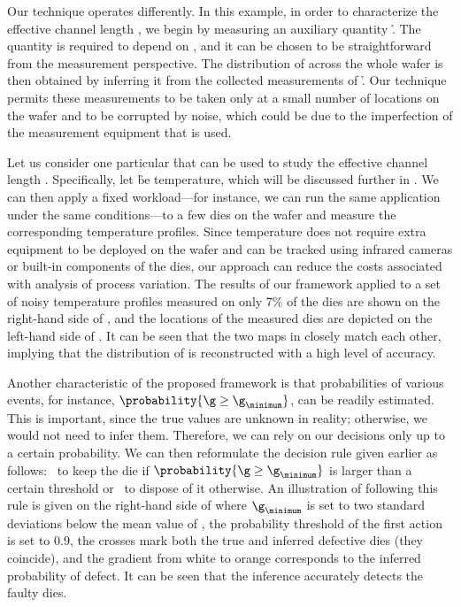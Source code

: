 Our technique operates differently. In this example, in order to characterize
the effective channel length \g, we begin by measuring an auxiliary quantity \h.
The quantity is required to depend on \g, and it can be chosen to be
straightforward from the measurement perspective. The distribution of \g across
the whole wafer is then obtained by inferring it from the collected measurements
of \h. Our technique permits these measurements to be taken only at a small
number of locations on the wafer and to be corrupted by noise, which could be
due to the imperfection of the measurement equipment that is used.

Let us consider one particular \h that can be used to study the effective
channel length \g. Specifically, let \h be temperature, which will be discussed
further in . We can then apply a fixed workload---for
instance, we can run the same application under the same conditions---to a few
dies on the wafer and measure the corresponding temperature profiles. Since
temperature does not require extra equipment to be deployed on the wafer and can
be tracked using infrared cameras \cite{mesa-martinez2007} or built-in
components of the dies, our approach can reduce the costs associated with
analysis of process variation. The results of our framework applied to a set of
noisy temperature profiles measured on only 7\% of the dies are shown on the
right-hand side of , and the locations of
the measured dies are depicted on the left-hand side of
. It can be seen that the two maps in
 closely match each other, implying that the
distribution of \g is reconstructed with a high level of accuracy.

Another characteristic of the proposed framework is that probabilities of
various events, for instance, $\probability{\g \geq \g_\minimum}$, can be
readily estimated. This is important, since the true values are unknown in
reality; otherwise, we would not need to infer them. Therefore, we can rely on
our decisions only up to a certain probability. We can then reformulate the
decision rule given earlier as follows: \one~to keep the die if $\probability{\g
\geq \g_\minimum}$ is larger than a certain threshold or \two~to dispose of it
otherwise. An illustration of following this rule is given on the right-hand
side of  where $\g_\minimum$ is set to two
standard deviations below the mean value of \g, the probability threshold of the
first action is set to 0.9, the crosses mark both the true and inferred
defective dies (they coincide), and the gradient from white to orange
corresponds to the inferred probability of defect. It can be seen that the
inference accurately detects the faulty dies.

